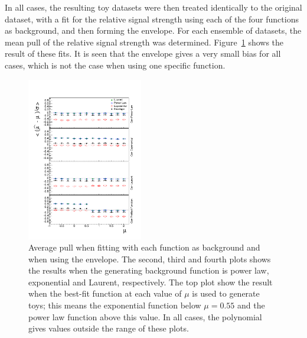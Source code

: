 In all cases, the resulting toy datasets were then treated identically to the
original dataset, with a fit for the relative signal strength using
each of the four functions as background, and then forming the envelope.
For each ensemble of datasets, the mean pull of the relative
signal strength was determined. Figure~\ref{fig:functions:firstorderbias}
shows the result of these fits. It is seen that the envelope gives a very small
bias for all cases, which is not the case when using one specific function.
%
\begin{figure}[tbp]
\centering
\includegraphics[width=0.45\textwidth]{functions/FirstOrderFunctions.pdf}
\caption{Average pull when fitting with each function as background and when
using the envelope. The second, third and fourth plots shows the results
when the generating background function is power law, exponential and Laurent,
respectively. The top plot show the result when the best-fit function at each
value of $\mu$ is used to generate toys; this means the exponential function
below $\mu = 0.55$ and the power law function above this value. In all cases,
the polynomial gives values outside the range of these plots.}
\label{fig:functions:firstorderbias}
\end{figure}

